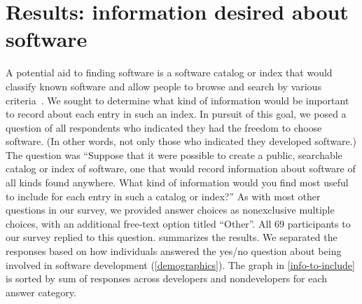 \documentclass{casicswhitepaper}
\newcommand{\totalRespondents}{69\xspace}
\begin{document}
\section{Results: information desired about software}
\label{desirable-metadata}

A potential aid to finding software is a software catalog or index that would classify known software and allow people to browse and search by various criteria~\cite{marshall2006software}.  We sought to determine what kind of information would be important to record about each entry in such an index.  In pursuit of this goal, we posed a question of all respondents who indicated they had the freedom to choose software.  (In other words, not only those who indicated they developed software.)  The question was ``Suppose that it were possible to create a public, searchable catalog or index of software, one that would record information about software of all kinds found anywhere.  What kind of information would you find most useful to include for each entry in such a catalog or index?''  As with most other questions in our survey, we provided answer choices as nonexclusive multiple choices, with an additional free-text option titled ``Other''.  All \totalRespondents participants to our survey replied to this question.   summarizes the results.  We separated the responses based on how individuals answered the yes/no question about being involved in software development (\ref{demographics}).  The graph in \ref{info-to-include} is sorted by sum of responses across developers and nondevelopers for each answer category.
\end{document}
